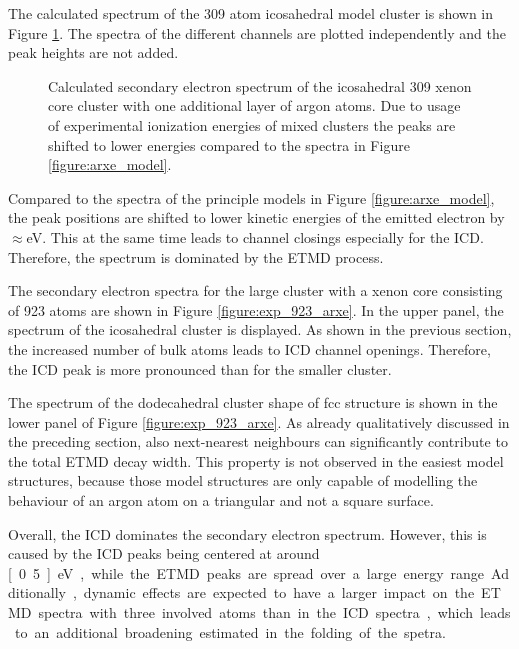 The calculated spectrum of the 309 atom icosahedral model cluster is
shown in Figure \ref{figure:exp_309ico_arxe}. The spectra of the different
channels are plotted independently and the peak heights are not added.

\begin{figure}[t]
 \centering
 
 \caption{Calculated secondary electron spectrum of the icosahedral
          309 xenon core cluster with one additional layer of argon
          atoms. Due to usage of experimental ionization energies of
          mixed clusters the peaks are shifted to lower energies compared
          to the spectra in Figure \ref{figure:arxe_model}.}
 \label{figure:exp_309ico_arxe}
\end{figure}

Compared to the spectra of the principle models in Figure \ref{figure:arxe_model},
the peak positions are shifted to lower kinetic energies of the emitted
electron by $\approx$\unit[1]{eV}. This at the same time leads to
channel closings especially for
the \ac{ICD}. Therefore, the spectrum is dominated by the \ac{ETMD} process.


The secondary electron spectra for the large cluster with a xenon
core consisting of 923 atoms are shown in Figure \ref{figure:exp_923_arxe}.
In the upper panel, the spectrum of the icosahedral cluster is displayed.
As shown in the previous section, the increased number of bulk atoms
leads to ICD channel openings. Therefore, the ICD peak is more pronounced
than for the smaller cluster.

The spectrum of the dodecahedral cluster shape of fcc structure is shown in
the lower panel of Figure \ref{figure:exp_923_arxe}. As already qualitatively
discussed in the preceding section, also next-nearest neighbours can
significantly contribute to the total ETMD decay width. This property is
not observed in the easiest model structures,
because those model structures are only capable of modelling the behaviour of an
argon atom on a triangular and not a square surface.

Overall, the ICD dominates the secondary electron spectrum. However, this
is caused by the ICD peaks being centered at around \unit[0.5]{eV}, while
the ETMD peaks are spread over a large energy range. Additionally, dynamic
effects are expected to have a larger impact on the ETMD spectra with three
involved atoms than in the ICD spectra, which leads to an additional
broadening estimated in the folding of the spetra.




